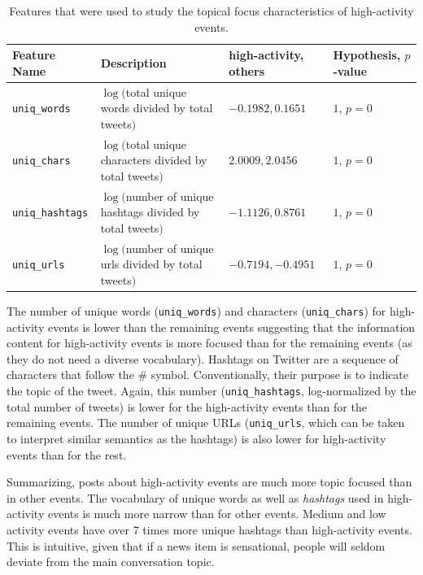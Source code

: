 \begin{table}
  \centering
  {\small
    \begin{tabular}{llll}
      \toprule
      Feature Name &  \multicolumn{1}{l}{Description} & high-activity, others & Hypothesis, $p$-value\\
      \midrule
      \texttt{uniq\_words} & \pbox{20cm}{$\log($total unique words \\divided by total tweets$)$} & $-0.1982, 0.1651$ & $1$, $p = 0$ \\
      \midrule
      \texttt{uniq\_chars} & \pbox{20cm}{$\log($total unique characters \\divided by total tweets$)$} & $2.0009, 2.0456$ & $1$, $p = 0$ \\
      \midrule
      \texttt{uniq\_hashtags} & \pbox{20cm}{$\log($number of unique hashtags\\ divided by total tweets$)$} & $-1.1126, 0.8761$ & $1$, $p = 0$ \\
      \midrule
      \texttt{uniq\_urls} & \pbox{20cm}{$\log($number of unique urls \\divided by total tweets$)$} & $-0.7194, -0.4951$ & $1$, $p = 0$ \\
      \bottomrule
    \end{tabular}
  } \caption[Topical focus features of events]{Features that were used to study
  the topical focus characteristics of high-activity events.}
  \label{tab:topical_focus}
\end{table}

The number of unique words (\texttt{uniq\_words}) and characters
(\texttt{uniq\_chars}) for high-activity events is lower than the remaining
events suggesting that the information content for high-activity events is more
focused than for the remaining events (as they do not need a diverse
vocabulary). 
%
Hashtags on Twitter are a sequence of characters that follow the \# symbol.
%
Conventionally, their purpose is to indicate the topic of the tweet. 
%
Again, this number (\texttt{uniq\_hashtags}, log-normalized by the total number
of tweets) is lower for the high-activity events than for the remaining events.
%
The number of unique URLs (\texttt{uniq\_urls}, which can be taken to interpret
similar semantics as the hashtags) is also lower for high-activity events than
for the rest. 



Summarizing, posts about high-activity events are much more topic focused than
in other events. 
%
The vocabulary of unique words as well as {\em hashtags} used in high-activity
events is much more narrow than for other events. 
%
Medium and low activity events have over 7 times more unique hashtags than
high-activity events. 
%
This is intuitive, given that if a news item is sensational, people will seldom
deviate from the main conversation topic.

